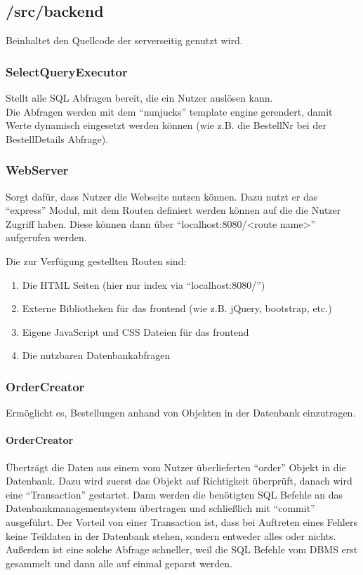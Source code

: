 \documentclass[12pt,pdftex,parskip=half]{scrartcl}
\begin{document}
    \newpage


    \subsection{/src/backend}

    Beinhaltet den Quellcode der serverseitig genutzt wird.

        \subsubsection{SelectQueryExecutor}
        Stellt alle SQL Abfragen bereit, die ein Nutzer auslösen kann.\\
        Die Abfragen werden mit dem "`nunjucks"' template engine gerendert, damit Werte dynamisch eingesetzt werden können (wie z.B. die BestellNr bei der BestellDetails Abfrage).

        \subsubsection{WebServer}
        Sorgt dafür, dass Nutzer die Webseite nutzen können. Dazu nutzt er das "`express"' Modul, mit dem Routen definiert werden können auf die die Nutzer Zugriff haben. Diese können dann über "`localhost:8080/<route name>"' aufgerufen werden.

        Die zur Verfügung gestellten Routen sind:

        \begin{enumerate}
            \item Die HTML Seiten (hier nur index via "`localhost:8080/"')
            \item Externe Bibliotheken für das frontend (wie z.B. jQuery, bootstrap, etc.)
            \item Eigene JavaScript und CSS Dateien für das frontend
            \item Die nutzbaren Datenbankabfragen
        \end{enumerate}

        \subsubsection{OrderCreator}
        Ermöglicht es, Bestellungen anhand von Objekten in der Datenbank einzutragen.

        \paragraph{OrderCreator}
        Überträgt die Daten aus einem vom Nutzer überlieferten ``order'' Objekt in die Datenbank.
        Dazu wird zuerst das Objekt auf Richtigkeit überprüft, danach wird eine "`Transaction"' gestartet. Dann werden die benötigten SQL Befehle an das Datenbankmanagementsystem übertragen und schließlich mit "`commit"' ausgeführt.
        Der Vorteil von einer Transaction ist, dass bei Auftreten eines Fehlers keine Teildaten in der Datenbank stehen, sondern entweder alles oder nichts. Außerdem ist eine solche Abfrage schneller, weil die SQL Befehle vom DBMS erst gesammelt und dann alle auf einmal geparst werden.
\end{document}
